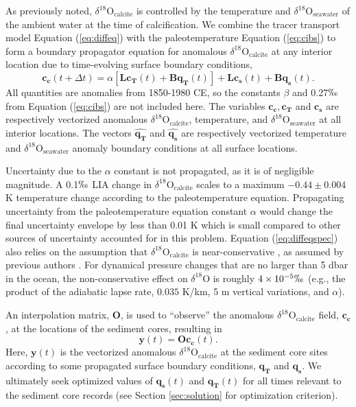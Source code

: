 \documentclass[draft]{agujournal2019}
\begin{document}
As previously noted, $\delta^{18}\mathrm{O}_{\mathrm{calcite}}$ is
controlled by the temperature and
$\delta^{18}\mathrm{O}_{\mathrm{seawater}}$ of the ambient water at the
time of calcification. We combine the tracer transport model
Equation (\ref{eq:diffeq}) with the paleotemperature Equation
(\ref{eq:cibs}) to form a boundary propagator equation \cite[]{Haine-Griffies-2025:Review} for anomalous $\delta^{18}\mathrm{O}_{\mathrm{calcite}}$ at any interior
location due to time-evolving
surface boundary conditions,
\begin{equation}
\label{eq:diffeqspec}
\mathbf{c_{c}}(t+\Delta t) = \alpha[\mathbf{L} \mathbf{c_{T}}(t) + \mathbf{B} \mathbf{q_{T}}(t)] + \mathbf{L}\mathbf{c_{s}}(t) + \mathbf{B}\mathbf{q_{s}}(t). 
\end{equation}
All quantities are anomalies from 1850-1980 CE, so the constants
$\beta$ and 0.27$\permil$ from Equation (\ref{eq:cibs}) are not included
here. The variables $\mathbf{c_c}, \mathbf{c_{T}}$ and $\mathbf{c_{s}}$ are respectively vectorized anomalous $\delta^{18}\mathrm{O}_{\mathrm{calcite}}$, temperature, and $\delta^{18}\mathrm{O}_{\mathrm{seawater}}$ at all interior locations.
The vectors $\mathbf{\hat{q_{T}}}$ and $\mathbf{\hat{q_{s}}}$ are respectively vectorized temperature and $\delta^{18}\mathrm{O}_{\mathrm{seawater}}$ anomaly boundary conditions at all
surface locations.

Uncertainty due to the $\alpha$ constant is not propagated,
  as it is of negligible magnitude. A 0.1$\permil$ LIA change in
  $\delta^{18}\mathrm{O}_{\mathrm{calcite}}$ scales
  to a maximum $-0.44 \pm 0.004 $ K temperature change according
  to the paleotemperature equation.
  Propagating uncertainty from the paleotemperature
  equation constant $\alpha$ would change the final uncertainty envelope
  by less than 0.01 K which is small
compared to other sources of uncertainty accounted for in this problem. Equation (\ref{eq:diffeqspec}) also relies on the assumption that
$\delta^{18}\mathrm{O}_{\mathrm{calcite}}$ is near-conservative
\cite[]{Lynch-Stieglitz-2003:Tracers}, as assumed by previous authors \cite{Lund2011, Gebbie-2012:Tracer, Amrhein-Gebbie-2015:Inferring}. For dynamical pressure changes that
  are no larger than 5 dbar in the ocean, the non-conservative effect
  on $\delta^{18}\mathrm{O}$ is roughly $4 \times 10^{-5} \permil$ (e.g., the
  product of the adiabatic lapse rate, $0.035$ K/km, 5 m vertical
  variations, and $\alpha$). 

An interpolation matrix, $\mathbf{O}$, is used to ``observe'' the
anomalous $\delta^{18}\mathrm{O}_{\mathrm{calcite}}$ field,
$\mathbf{c_{c}}$, at the locations of the sediment cores, resulting in
\begin{equation}
\label{eq:yeff}
\mathbf{y}(t) = \mathbf{O}\mathbf{c_{c}}(t). 
\end{equation}
Here, $\mathbf{y}(t)$ is the vectorized anomalous
$\delta^{18}\mathrm{O}_{\mathrm{calcite}}$ at the sediment core sites
according to some propagated surface boundary conditions,
$\mathbf{q_{T}}$ and $\mathbf{q_{s}}$. We ultimately seek optimized values of
$\mathbf{q_{s}}(t)$ and $\mathbf{q_{T}}(t)$ for all times relevant to
the sediment core records (see Section \ref{sec:solution} for optimization
  criterion).
\end{document}
